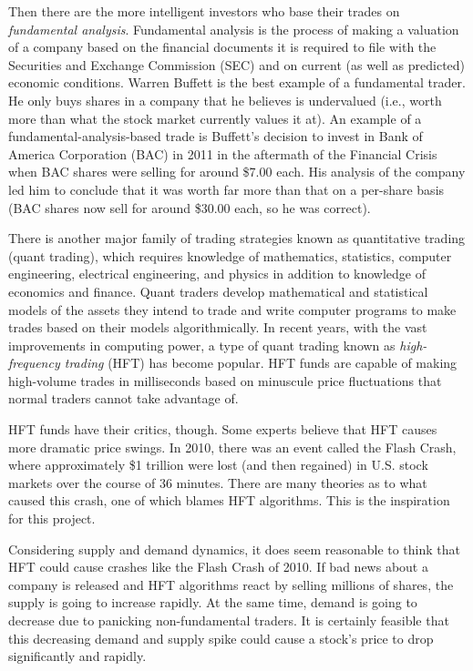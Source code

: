 \documentclass[12pt]{article}
\begin{document}
Then there are the more intelligent investors who base their trades on \textit{fundamental analysis}.  Fundamental analysis is the process of making a valuation of a company based on the financial documents it is required to file with the Securities and Exchange Commission (SEC) and on current (as well as predicted) economic conditions. Warren Buffett is the best example of a fundamental trader. He only buys shares in a company that he believes is undervalued (i.e., worth more than what the stock market currently values it at). An example of a fundamental-analysis-based trade is Buffett's decision to invest in Bank of America Corporation (BAC) in 2011 in the aftermath of the Financial Crisis when BAC shares were selling for around \$7.00 each. His analysis of the company led him to conclude that it was worth far more than that on a per-share basis (BAC shares now sell for around \$30.00 each, so he was correct). 

There is another major family of trading strategies known as quantitative trading (quant trading), which requires knowledge of mathematics, statistics, computer engineering, electrical engineering, and physics in addition to knowledge of economics and finance. Quant traders develop mathematical and statistical models of the assets they intend to trade and write computer programs to make trades based on their models algorithmically. In recent years, with the vast improvements in computing power, a type of quant trading known as \textit{high-frequency trading} (HFT) has become popular. HFT funds are capable of making high-volume trades in milliseconds based on minuscule price fluctuations that normal traders cannot take advantage of.

HFT funds have their critics, though. Some experts believe that HFT causes more dramatic price swings.  In 2010, there was an event called the Flash Crash, where approximately \$1 trillion were lost (and then regained) in U.S. stock markets over the course of 36 minutes.  There are many theories as to what caused this crash, one of which blames HFT algorithms. This is the inspiration for this project. 

Considering supply and demand dynamics, it does seem reasonable to think that HFT could cause crashes like the Flash Crash of 2010. If bad news about a company is released and HFT algorithms react by selling millions of shares, the supply is going to increase rapidly.  At the same time, demand is going to decrease due to panicking non-fundamental traders. It is certainly feasible that this decreasing demand and supply spike could cause a stock's price to drop significantly and rapidly.
\end{document}
